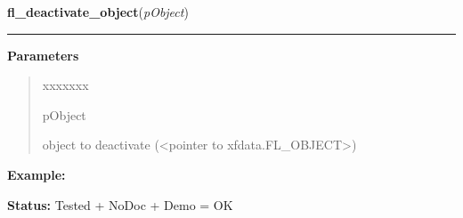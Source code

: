     \label{xformslib:library:fl_deactivate_object}

    \vspace{0.5ex}

\hspace{.8\funcindent}\begin{boxedminipage}{\funcwidth}

    \raggedright \textbf{fl\_deactivate\_object}(\textit{pObject})

    \vspace{-1.5ex}

    \rule{\textwidth}{0.5\fboxrule}
\setlength{\parskip}{2ex}
\setlength{\parskip}{1ex}
      \textbf{Parameters}
      \vspace{-1ex}

      \begin{quote}
        \begin{Ventry}{xxxxxxx}

          \item[pObject]

          object to deactivate ({\textless}pointer to 
          xfdata.FL\_OBJECT{\textgreater})

        \end{Ventry}

      \end{quote}

\textbf{Example:} 

\textbf{Status:} Tested + NoDoc + Demo = OK



    \end{boxedminipage}

    \label{xformslib:library:fl_object_is_active}

    \vspace{0.5ex}

